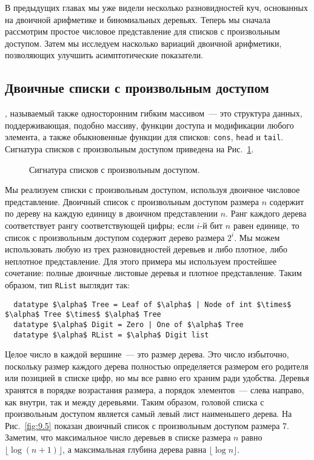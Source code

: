 В предыдущих главах мы уже видели несколько разновидностей куч,
основанных на двоичной арифметике и биномиальных деревьях. Теперь мы
сначала рассмотрим простое числовое представление для списков с
произвольным доступом. Затем мы исследуем насколько вариаций двоичной
арифметики, позволяющих улучшить асимптотические показатели.

\subsection{Двоичные списки с произвольным доступом}
\label{sc:9.2.1}

, называемый
также односторонним гибким массивом~--- это структура данных,
поддерживающая, подобно массиву, функции доступа и модификации любого
элемента, а также обыкновенные функции для списков: \lstinline!cons!,
\lstinline!head! и \lstinline!tail!. Сигнатура списков с произвольным
доступом приведена на Рис.~\ref{fig:9.4}.

\begin{figure}
  \centering
  
  \caption{Сигнатура списков с произвольным доступом.}
  \label{fig:9.4}
\end{figure}

Мы реализуем списки с произвольным доступом, используя двоичное
числовое представление. Двоичный список с произвольным доступом
размера $n$ содержит по дереву на каждую единицу в двоичном
представлении $n$. Ранг каждого дерева соответствует рангу
соответствующей цифры; если $i$-й бит $n$ равен единице, то список с
произвольным доступом содержит дерево размера $2^i$. Мы можем
использовать любую из трех разновидностей деревьев и либо плотное,
либо неплотное представление. Для этого примера мы используем
простейшее сочетание: полные двоичные листовые деревья и плотное
представление. Таким образом, тип \lstinline!RList! выглядит так:
\begin{lstlisting}
  datatype $\alpha$ Tree = Leaf of $\alpha$ | Node of int $\times$ $\alpha$ Tree $\times$ $\alpha$ Tree
  datatype $\alpha$ Digit = Zero | One of $\alpha$ Tree
  datatype $\alpha$ RList = $\alpha$ Digit list
\end{lstlisting}
Целое число в каждой вершине~--- это размер дерева. Это число
избыточно, поскольку размер каждого дерева полностью определяется
размером его родителя или позицией в списке цифр, но мы все равно его
храним ради удобства. Деревья хранятся в порядке возрастания размера,
а порядок элементов~--- слева направо, как внутри, так и между
деревьями. Таким образом, головой списка с произвольным доступом
является самый левый лист наименьшего дерева. На Рис.~\ref{fig:9.5}
показан двоичный список с произвольным доступом размера 7. Заметим,
что максимальное число деревьев в списке размера $n$ равно 
$\lfloor \log (n+1) \rfloor$, а максимальная глубина дерева равна 
$\lfloor \log n \rfloor$.

